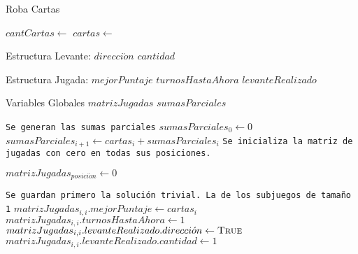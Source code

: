 \documentclass[11pt, a4paper, twoside]{article}
\begin{document}
\begin{algorithm}[H]
\caption{Roba Cartas}
\footnotesize\begin{algorithmic}[1]
  \Require
    \Statex $cantCartas \gets$  
    \Statex $cartas \gets$  
    
  \Ensure
    \Statex {} 
    \Statex {} 
    \Statex {} 
    \Statex {}     
	\Statex
	
	\Statex Estructura Levante:
	\Statex \hspace{0.15cm} $direcci \acute{o}n$ 	
	\Statex \hspace{0.15cm} $cantidad$				
	
	\Statex
	
	\Statex Estructura Jugada:
	\Statex \hspace{0.15cm} $mejorPuntaje$			
	\Statex \hspace{0.15cm} $turnosHastaAhora$		
	\Statex \hspace{0.15cm} $levanteRealizado$		

	\Statex 
	\Statex Variables Globales
	\Statex \hspace{0.15cm} $matrizJugadas$			
	\Statex \hspace{0.15cm} $sumasParciales$		
	
	\Statex
	\Statex	
	
	\Statex \texttt{Se generan las sumas parciales}
	\State $sumasParciales_0 \gets 0$
		\State $sumasParciales_{i+1} \gets cartas_i + sumasParciales_{i}$
	\EndFor
	\Statex
	\Statex \texttt{Se inicializa la matriz de jugadas con cero en todas sus posiciones.}
	
		\State $matrizJugadas_{posici \acute{o}n} \gets 0$
	\EndFor
	
	\Statex
	\Statex \texttt{Se guardan primero la solución trivial. La de los subjuegos de tamaño 1}
		\State $matrizJugadas_{i,i}.mejorPuntaje \gets cartas_i$
		\State $matrizJugadas_{i,i}.turnosHastaAhora \gets 1$
		\State $matrizJugadas_{i,i}.levanteRealizado.direcci \acute{o}n \gets \Call{True}{}$
		\State $matrizJugadas_{i,i}.levanteRealizado.cantidad \gets 1$
	\EndFor


\end{algorithmic}
\end{algorithm}
\end{document}
